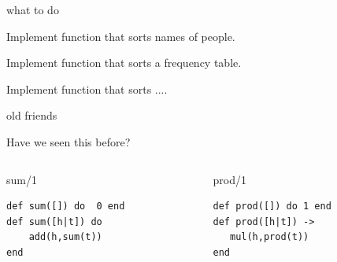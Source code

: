 \begin{frame}{what to do}

\vspace{10pt}\pause Implement function that sorts names of people.

\vspace{10pt}\pause Implement function that sorts a frequency table.

\vspace{10pt}\pause Implement function that sorts ....

\end{frame}

\begin{frame}[fragile]{old friends}

Have we seen this before?

\pause\vspace{20pt}
\begin{columns}
   \begin{column}{.5\linewidth}
     \begin{block}{sum/1}
       \begin{verbatim}
def sum([]) do  0 end
def sum([h|t]) do
    add(h,sum(t))
end
       \end{verbatim}
       \vfill
     \end{block}
   \end{column} 
\pause
   \begin{column}{.5\linewidth}
     \begin{block}{prod/1}
       \begin{verbatim}
def prod([]) do 1 end
def prod([h|t]) ->
   mul(h,prod(t))
end
       \end{verbatim}
       \vfill
     \end{block}
   \end{column}
  \end{columns}

\vspace{20pt}{\em There is no built-in add/2, nor mul/2, but we can pretend that there is.}

\end{frame}


